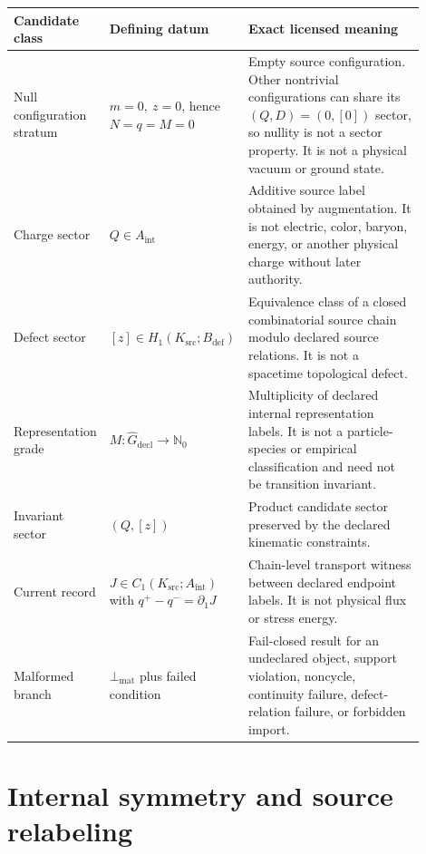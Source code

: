 \documentclass[11pt]{article}
\newcommand{\Ksrc}{K_{\mathrm{src}}}
\newcommand{\Aint}{A_{\mathrm{int}}}
\newcommand{\Bdef}{B_{\mathrm{def}}}
\newcommand{\Rdecl}{\widehat G_{\mathrm{decl}}}
\newcommand{\Malformed}{\bot_{\mathrm{mat}}}
\begin{document}
\begin{longtable}{p{0.19\linewidth}p{0.28\linewidth}p{0.43\linewidth}}
\toprule
Candidate class & Defining datum & Exact licensed meaning \\
\midrule
\endhead
Null configuration stratum &
\(m=0,\ z=0\), hence \(N=q=M=0\) &
Empty source configuration. Other nontrivial configurations can share its
\((Q,D)=(0,[0])\) sector, so nullity is not a sector property. It is not a
physical vacuum or ground state.\\
Charge sector &
\(Q\in\Aint\) &
Additive source label obtained by augmentation. It is not electric, color,
baryon, energy, or another physical charge without later authority.\\
Defect sector &
\([z]\in H_1(\Ksrc;\Bdef)\) &
Equivalence class of a closed combinatorial source chain modulo declared
source relations. It is not a spacetime topological defect.\\
Representation grade &
\(M:\Rdecl\to\mathbb N_0\) &
Multiplicity of declared internal representation labels. It is not a
particle-species or empirical classification and need not be transition
invariant.\\
Invariant sector &
\((Q,[z])\) &
Product candidate sector preserved by the declared kinematic constraints.\\
Current record &
\(J\in C_1(\Ksrc;\Aint)\) with
\(q^+-q^-=\partial_1J\) &
Chain-level transport witness between declared endpoint labels. It is not
physical flux or stress energy.\\
Malformed branch &
\(\Malformed\) plus failed condition &
Fail-closed result for an undeclared object, support violation, noncycle,
continuity failure, defect-relation failure, or forbidden import.\\
\bottomrule
\end{longtable}

\section{Internal symmetry and source relabeling}
\end{document}
